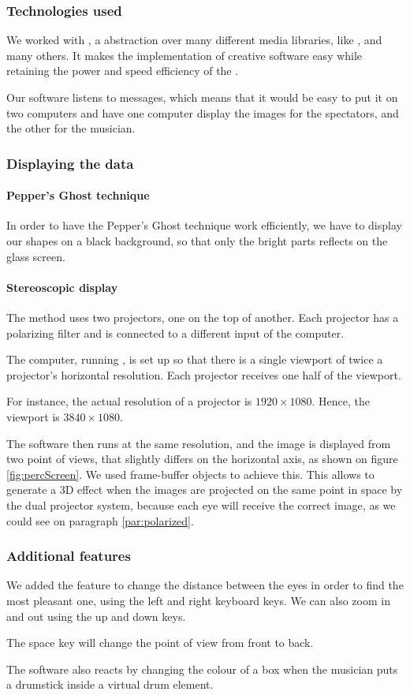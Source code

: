 \subsubsection{Technologies used}
We worked with , a  abstraction over many different media libraries, like ,  and many others. It makes the implementation of creative software easy while retaining the power and speed efficiency of the .

Our software listens to  messages, which means that it would be easy to put it on two computers and have one computer display the images for the spectators, and the other for the musician.

\subsubsection{Displaying the data}
\paragraph{Pepper's Ghost technique}
In order to have the Pepper's Ghost technique work efficiently, we have to display our shapes on a black background, so that only the bright parts reflects on the glass screen.

\paragraph{Stereoscopic display}
The method uses two projectors, one on the top of another.
Each projector has a polarizing filter and is connected to a different input of the computer.

The computer, running , is set up so that there is a single viewport of twice a projector's horizontal resolution. Each projector receives one half of the viewport.

For instance, the actual resolution of a projector is $1920 \times 1080$. Hence, the viewport is $3840 \times 1080$.

The software then runs at the same resolution, and the image is displayed from two point of views, that slightly differs on the horizontal axis, as shown on figure \ref{fig:percScreen}. We used frame-buffer objects to achieve this. This allows to generate a 3D effect when the images are projected on the same point in space by the dual projector system, because each eye will receive the correct image, as we could see on paragraph \ref{par:polarized}.

\subsubsection{Additional features}
We added the feature to change the distance between the eyes in order to find the most pleasant one, using the left and right keyboard keys.
We can also zoom in and out using the up and down keys.

The space key will change the point of view from front to back.

The software also reacts by changing the colour of a box when the musician puts a drumstick inside a virtual drum element.

